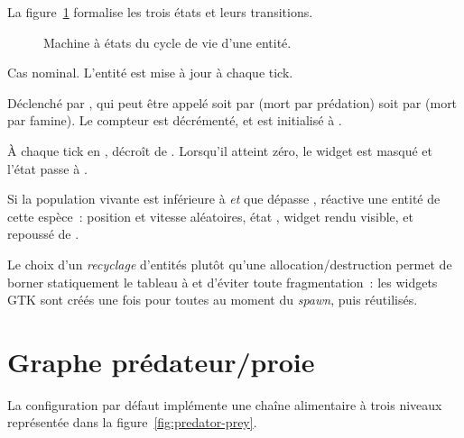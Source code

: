 La figure~\ref{fig:lifecycle} formalise les trois états et
leurs transitions.

\begin{figure}[h!]
\centering

\caption{Machine à états du cycle de vie d'une entité.}
\label{fig:lifecycle}
\end{figure}

\begin{description}[leftmargin=3em, style=nextline]
  \item[\code{ALIVE} $\to$ \code{ALIVE}.] Cas nominal. L'entité
    est mise à jour à chaque tick.

  \item[\code{ALIVE} $\to$ \code{DYING}.] Déclenché par
    , qui peut être appelé soit par
     (mort par prédation) soit par
     (mort par famine). Le
    compteur  est décrémenté, et
     est initialisé à
    .

  \item[\code{DYING} $\to$ \code{INACTIVE}.] À chaque tick en
    ,  décroît de .
    Lorsqu'il atteint zéro, le widget est masqué et l'état
    passe à .

  \item[\code{INACTIVE} $\to$ \code{ALIVE}.] Si la population
    vivante est inférieure à  \emph{et} que
     dépasse ,
     réactive une entité
     de cette espèce~: position et vitesse
    aléatoires, état , widget rendu visible, et
     repoussé de .
\end{description}

Le choix d'un \emph{recyclage} d'entités plutôt qu'une
allocation/destruction permet de borner statiquement le tableau
 à  et d'éviter toute
fragmentation~: les widgets GTK sont créés une fois pour toutes
au moment du \emph{spawn}, puis réutilisés.

\section{Graphe prédateur/proie}

La configuration par défaut implémente une chaîne alimentaire à
trois niveaux représentée dans la figure~\ref{fig:predator-prey}.

